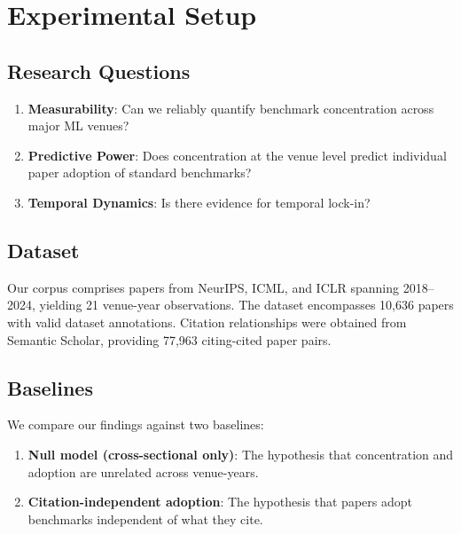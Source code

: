 \section{Experimental Setup}

\subsection{Research Questions}

\begin{enumerate}
    \item \textbf{Measurability}: Can we reliably quantify benchmark concentration across major ML venues?
    \item \textbf{Predictive Power}: Does concentration at the venue level predict individual paper adoption of standard benchmarks?
    \item \textbf{Temporal Dynamics}: Is there evidence for temporal lock-in?
\end{enumerate}

\subsection{Dataset}

Our corpus comprises papers from NeurIPS, ICML, and ICLR spanning 2018--2024, yielding 21 venue-year observations. The dataset encompasses 10,636 papers with valid dataset annotations. Citation relationships were obtained from Semantic Scholar, providing 77,963 citing-cited paper pairs.

\subsection{Baselines}

We compare our findings against two baselines:

\begin{enumerate}
    \item \textbf{Null model (cross-sectional only)}: The hypothesis that concentration and adoption are unrelated across venue-years.
    \item \textbf{Citation-independent adoption}: The hypothesis that papers adopt benchmarks independent of what they cite.
\end{enumerate}
